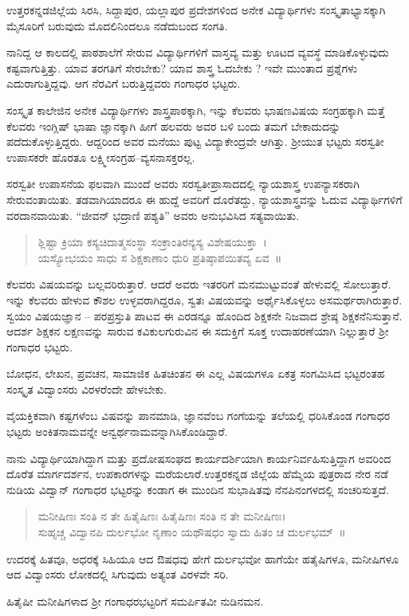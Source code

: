 ಉತ್ತರಕನ್ನಡಜಿಲ್ಲೆಯ ಸಿರಸಿ, ಸಿದ್ದಾಪುರ, ಯಲ್ಲಾಪುರ ಪ್ರದೇಶಗಳಿಂದ ಅನೇಕ ವಿದ್ಯಾರ್ಥಿಗಳು ಸಂಸ್ಕೃತಾಭ್ಯಾಸಕ್ಕಾಗಿ ಮೈಸೂರಿಗೆ ಬರುವುದು ಮೊದಲಿನಿಂದಲೂ ನಡೆದುಬಂದ ಸಂಗತಿ. 

ನಾನಿದ್ದ ಆ ಕಾಲದಲ್ಲಿ ಪಾಠಶಾಲೆಗೆ ಸೇರುವ ವಿದ್ಯಾರ್ಥಿಗಳಿಗೆ ವಾಸ್ತವ್ಯ ಮತ್ತು ಊಟದ ವ್ಯವಸ್ಥೆ ಮಾಡಿಕೊಳ್ಳುವುದು ಕಷ್ಟವಾಗುತ್ತಿತ್ತು. ಯಾವ ತರಗತಿಗೆ ಸೇರಬೇಕು? ಯಾವ ಶಾಸ್ತ್ರ ಓದಬೇಕು ? ಇವೇ ಮುಂತಾದ ಪ್ರಶ್ನೆಗಳು ಎದುರಾಗುತ್ತಿದ್ದವು. ಆಗ ನೆರವಿಗೆ ಬರುತ್ತಿದ್ದವರು ಗಂಗಾಧರ ಭಟ್ಟರು.

ಸಂಸ್ಕೃತ ಕಾಲೇಜಿನ ಅನೇಕ ವಿದ್ಯಾರ್ಥಿಗಳು ಶಾಸ್ತ್ರಪಾಠಕ್ಕಾಗಿ, ಇನ್ನು ಕೆಲವರು ಭಾಷಣವಿಷಯ ಸಂಗ್ರಹಕ್ಕಾಗಿ ಮತ್ತೆ ಕೆಲವರು ಇಂಗ್ಲಿಷ್ ಭಾಷಾ ಜ್ಞಾನಕ್ಕಾಗಿ ಹೀಗೆ ಹಲವರು ಅವರ ಬಳಿ ಬಂದು ತಮಗೆ ಬೇಕಾದುದನ್ನು ಪದೆದುಕೊಳ್ಳುತ್ತಿದ್ದರು. ಆದ್ದರಿಂದ ಅವರ ಮನೆಯು ಪುಟ್ಟ ವಿದ್ಯಾಕೇಂದ್ರವೇ ಆಗಿತ್ತು. ಶ್ರೀಯುತ ಭಟ್ಟರು ಸರಸ್ವತೀ ಉಪಾಸಕರೇ ಹೊರತೂ ಲಕ್ಷ್ಮೀಸಂಗ್ರಹ–ವ್ಯಸನಾಸಕ್ತರಲ್ಲ.

ಸರಸ್ವತೀ ಉಪಾಸನೆಯ ಫಲವಾಗಿ ಮುಂದೆ ಅವರು ಸರಸ್ವತೀಪ್ರಾಸಾದದಲ್ಲಿ ನ್ಯಾಯಶಾಸ್ತ್ರ ಉಪನ್ಯಾಸಕರಾಗಿ ಸೇರುವಂತಾಯಿತು. ತಡವಾಗಿಯಾದರೂ ಈ ಹುದ್ದೆ ಅವರಿಗೆ ದೊರೆತದ್ದು, ನ್ಯಾಯಶಾಸ್ತ್ರವನ್ನು ಓದುವ ವಿದ್ಯಾರ್ಥಿಗಳಿಗೆ ವರದಾನವಾಯಿತು. “ಜೀವನ್ ಭದ್ರಾಣಿ ಪಶ್ಯತಿ” ಅವರು ಅನುಭವಿಸಿದ ಸತ್ಯವಾಯಿತು.
\begin{verse}
ಶ್ಲಿಷ್ಟಾ ಕ್ರಿಯಾ ಕಸ್ಯಚಿದಾತ್ಮಸಂಸ್ಥಾ ಸಂಕ್ರಾಂತಿರನ್ಯಸ್ಯ ವಿಶೇಷಯುಕ್ತಾ~।\\
ಯಸ್ಯೋಭಯಂ ಸಾಧು ಸ ಶಿಕ್ಷಕಾಣಾಂ ಧುರಿ ಪ್ರತಿಷ್ಠಾಪಯಿತವ್ಯ ಏವ~॥
\end{verse}
ಕೆಲವರು ವಿಷಯವನ್ನು ಬಲ್ಲವರಿರುತ್ತಾರೆ. ಆದರೆ ಅವರು ಇತರರಿಗೆ ಮನಮುಟ್ಟುವಂತೆ ಹೇಳುವಲ್ಲಿ ಸೋಲುತ್ತಾರೆ. ಇನ್ನು ಕೆಲವರು ಹೇಳುವ ಕೌಶಲ ಉಳ್ಳವರಾಗಿದ್ದರೂ, ಸ್ವತಃ ವಿಷಯವನ್ನು ಅರ್ಥೈಸಿಕೊಳ್ಳಲು ಅಸಮರ್ಥರಾಗಿರುತ್ತಾರೆ. ಸ್ವಯಂ ವಿಷಯಜ್ಞಾನ – ಪರಪ್ರಸ್ತುತಿ ಪಾಟವ ಈ ಎರಡನ್ನೂ ಹೊಂದಿದ ಶಿಕ್ಷಕನೇ ನಿಜವಾದ ಶ್ರೇಷ್ಠ ಶಿಕ್ಷಕನೆನಿಸುತ್ತಾನೆ. ಆದರ್ಶ ಶಿಕ್ಷಕನ ಲಕ್ಷಣವನ್ನು ಸಾರುವ ಕವಿಕುಲಗುರುವಿನ ಈ ಸದುಕ್ತಿಗೆ ಸೂಕ್ತ ಉದಾಹರಣೆಯಾಗಿ ನಿಲ್ಲುತ್ತಾರೆ ಶ್ರೀ ಗಂಗಾಧರ ಭಟ್ಟರು.

ಬೋಧನ, ಲೇಖನ, ಪ್ರವಚನ, ಸಾಮಾಜಿಕ ಹಿತಚಿಂತನ ಈ ಎಲ್ಲ ವಿಷಯಗಳೂ ಏಕತ್ರ ಸಂಗಮಿಸಿದ ಭಟ್ಟರಂತಹ ಸಂಸ್ಕೃತ ವಿದ್ವಾಂಸರು ವಿರಳರೆಂದೇ ಹೇಳಬೇಕು. 

ವೈಯಕ್ತಿಕವಾಗಿ ಕಷ್ಟಗಳೆಂಬ ವಿಷವನ್ನು ಪಾನಮಾಡಿ, ಜ್ಞಾನವೆಂಬ ಗಂಗೆಯನ್ನು ತಲೆಯಲ್ಲಿ ಧರಿಸಿಕೊಂಡ ಗಂಗಾಧರ ಭಟ್ಟರು ಅಂಕಿತನಾಮವನ್ನೇ ಅನ್ವರ್ಥನಾಮವನ್ನಾಗಿಸಿಕೊಂಡಿದ್ದಾರೆ.

ನಾನು ವಿದ್ಯಾರ್ಥಿಯಾಗಿದ್ದಾಗ ಮತ್ತು ಪ್ರದೋಷಸಂಘದ ಕಾರ್ಯದರ್ಶಿಯಾಗಿ ಕಾರ್ಯನಿರ್ವಹಿಸುತ್ತಿದ್ದಾಗ ಅವರಿಂದ ದೊರೆತ ಮಾರ್ಗದರ್ಶನ, ಉಪಕಾರಗಳನ್ನು ಮರೆಯಲಾರೆ.ಉತ್ತರಕನ್ನಡ ಜಿಲ್ಲೆಯ ಹೆಮ್ಮೆಯ ಪುತ್ರರಾದ ನೇರ ನಡೆ ನುಡಿಯ ವಿದ್ವಾನ್ ಗಂಗಾಧರ ಭಟ್ಟರನ್ನು ಕಂಡಾಗ ಈ ಮುಂದಿನ ಸುಭಾಷಿತವು ನೆನಪಿನಂಗಳದಲ್ಲಿ ಸಂಚರಿಸುತ್ತದೆ.
\begin{verse}
ಮನೀಷಿಣಃ ಸಂತಿ ನ ತೇ ಹಿತೈಷಿಣಃ ಹಿತೈಷಿಣಃ ಸಂತಿ ನ ತೇ ಮನೀಷಿಣಃ।\\
ಸುಹೃಚ್ಚ ವಿದ್ವಾನಪಿ ದುರ್ಲಭೋ ನೃಣಾಂ ಯಥೌಷಧಂ ಸ್ವಾದು ಹಿತಂ ಚ ದುರ್ಲಭಮ್~॥
\end{verse}
ಉದರಕ್ಕೆ ಹಿತವೂ, ಅಧರಕ್ಕೆ ಸಿಹಿಯೂ ಆದ ಔಷಧವು ಹೇಗೆ ದುರ್ಲಭವೋ ಹಾಗೆಯೇ ಹತೈಷಿಗಳೂ, ಮನೀಷಿಗಳೂ ಆದ ವಿದ್ವಾಂಸರು ಲೋಕದಲ್ಲಿ ಸಿಗುವುದು ಅತ್ಯಂತ ವಿರಳವೇ ಸರಿ. 

ಹಿತೈಷೀ ಮನೀಷಿಗಳಾದ ಶ್ರೀ ಗಂಗಾಧರಭಟ್ಟರಿಗೆ ಸಮರ್ಪಿತವೀ ನುಡಿನಮನ.

\articleend

